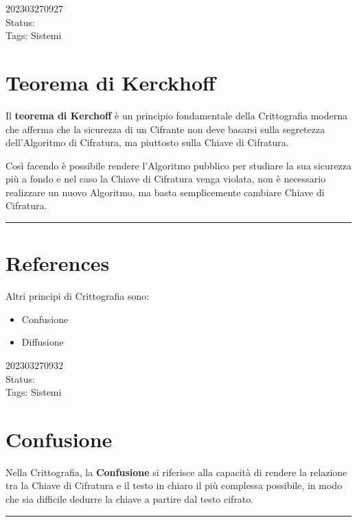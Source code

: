 \documentclass[
]{article}
\providecommand{\tightlist}{%
  \setlength{\itemsep}{0pt}\setlength{\parskip}{0pt}}
\begin{document}
202303270927\\
Status:\\
Tags: Sistemi

\hypertarget{teorema-di-kerckhoff}{%
\section{Teorema di Kerckhoff}\label{teorema-di-kerckhoff}}

Il \textbf{teorema di Kerchoff} è un principio fondamentale della
Crittografia moderna che afferma che la sicurezza di un Cifrante non
deve basarsi sulla segretezza dell'Algoritmo di Cifratura, ma piuttosto
sulla Chiave di Cifratura.

Così facendo è possibile rendere l'Algoritmo pubblico per studiare la
sua sicurezza più a fondo e nel caso la Chiave di Cifratura venga
violata, non è necessario realizzare un nuovo Algoritmo, ma basta
semplicemente cambiare Chiave di Cifratura.

\begin{center}\rule{0.5\linewidth}{0.5pt}\end{center}

\hypertarget{references-9}{%
\section{References}\label{references-9}}

Altri principi di Crittografia sono:

\begin{itemize}
\tightlist
\item
  Confusione
\item
  Diffusione
\end{itemize}

202303270932\\
Status:\\
Tags: Sistemi

\hypertarget{confusione}{%
\section{Confusione}\label{confusione}}

Nella Crittografia, la \textbf{Confusione} si riferisce alla capacità di
rendere la relazione tra la Chiave di Cifratura e il testo in chiaro il
più complessa possibile, in modo che sia difficile dedurre la chiave a
partire dal testo cifrato.

\begin{center}\rule{0.5\linewidth}{0.5pt}\end{center}
\end{document}

